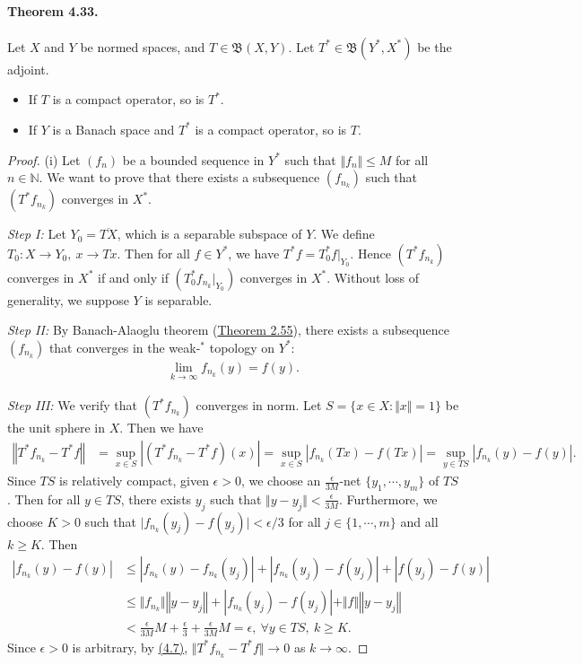 \documentclass{article}
\begin{document}
\paragraph{Theorem 4.33.\label{thm:4.33}} Let $X$ and $Y$ be normed spaces, and $T\in\mathfrak{B}(X,Y)$. Let $T^*\in\mathfrak{B}(Y^*,X^*)$ be the adjoint.
\begin{itemize}
	\item[(i)] If $T$ is a compact operator, so is $T^*$. 
	\item[(ii)] If $Y$ is a Banach space and $T^*$ is a compact operator, so is $T$.
\end{itemize}
\begin{proof}
(i) Let $(f_n)$ be a bounded sequence in $Y^*$ such that $\Vert f_n\Vert\leq M$ for all $n\in\mathbb{N}$. We want to prove that there exists a subsequence $(f_{n_k})$ such that $(T^*f_{n_k})$ converges in $X^*$.

\textit{Step I:} Let $Y_0=\overline{TX}$, which is a separable subspace of $Y$. We define $T_0:X\to Y_0,\ x\to Tx$. Then for all $f\in Y^*$, we have $T^*f=T_0^*f|_{Y_0}$. Hence $(T^*f_{n_k})$ converges in $X^*$ if and only if $(T^*_0f_{n_k}|_{Y_0})$ converges in $X^*$. Without loss of generality, we suppose $Y$ is separable.

\textit{Step II:} By Banach-Alaoglu theorem (\hyperref[thm:2.55]{Theorem 2.55}), there exists a subsequence $(f_{n_k})$ that converges in the weak-$^*$ topology on $Y^*$:
\begin{align*}
	\lim_{k\to\infty} f_{n_k}(y)= f(y).
\end{align*}

\textit{Step III:} We verify that $(T^*f_{n_k})$ converges in norm. Let $S=\{x\in X:\Vert x\Vert=1\}$ be the unit sphere in $X$. Then we have
\begin{align*}
	\left\Vert T^*f_{n_k} - T^*f\right\Vert &= \sup_{x\in S}\left\vert (T^*f_{n_k} - T^*f)(x)\right\vert =\sup_{x\in S}\left\vert f_{n_k}(Tx) - f(Tx)\right\vert =\sup_{y\in TS}\left\vert f_{n_k}(y) - f(y)\right\vert.\tag{4.7}\label{eq:4.7}
\end{align*}
Since $TS$ is relatively compact, given $\epsilon>0$, we choose an $\frac{\epsilon}{3M}$-net $\{y_1,\cdots,y_m\}$ of $TS$. Then for all $y\in TS$, there exists $y_j$ such that $\Vert y-y_j\Vert<\frac{\epsilon}{3M}$. Furthermore, we choose $K>0$ such that $\vert f_{n_k}(y_j) - f(y_j)\vert<\epsilon/3$ for all $j\in\{1,\cdots,m\}$ and all $k\geq K$. Then
\begin{align*}
	\left\vert f_{n_k}(y) - f(y)\right\vert &\leq \left\vert f_{n_k}(y) - f_{n_k}(y_j)\right\vert + \left\vert f_{n_k}(y_j) - f(y_j)\right\vert + \left\vert f(y_j) - f(y)\right\vert\\
	&\leq \Vert f_{n_k}\Vert\left\Vert y-y_j\right\Vert + \left\vert f_{n_k}(y_j) - f(y_j)\right\vert + \Vert f\Vert\left\Vert y-y_j\right\Vert \\
	&< \frac{\epsilon}{3M}M +  \frac{\epsilon}{3} +  \frac{\epsilon}{3M}M = \epsilon,\ \forall y\in TS,\ k\geq K.
\end{align*}
Since $\epsilon>0$ is arbitrary, by \hyperref[eq:4.7]{(4.7)}, $\Vert T^*f_{n_k}- T^*f\Vert\to 0$ as $k\to\infty$.\vspace{0.1cm}


\end{proof}
\end{document}
